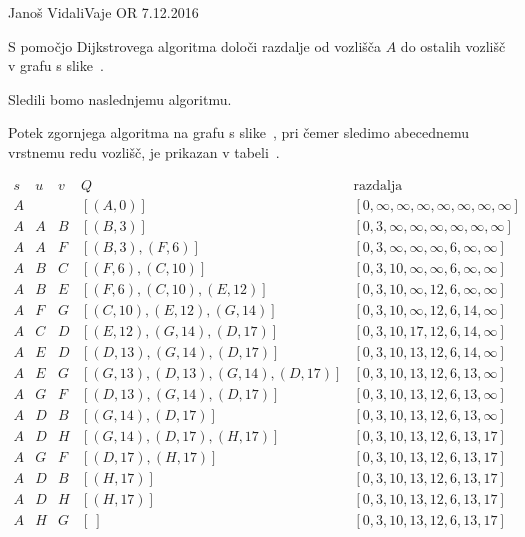 \begin{naloga}{Janoš Vidali}{Vaje OR 7.12.2016}
\begin{vprasanje}
S pomočjo Dijkstrovega algoritma
določi razdalje od vozlišča $A$ do ostalih vozlišč
v grafu s slike~\fig.

\begin{slika}
\pgfslika
{}
\end{slika}
\end{vprasanje}


\begin{odgovor}
Sledili bomo naslednjemu algoritmu.

Potek zgornjega algoritma na grafu s slike~\fig,
pri čemer sledimo abecednemu vrstnemu redu vozlišč,
je prikazan v tabeli~\tab.


\begin{tabela}
$$
\begin{array}{c|c|c|c|c}
s & u & v & Q & \text{razdalja} \\ \hline
A &   &   & [(A,0)]  & [0, \infty, \infty, \infty, \infty, \infty, \infty, \infty] \\
A & A  &  B & [(B, 3)]  & [0, 3, \infty, \infty, \infty, \infty, \infty, \infty] \\
A & A  &  F & [(B, 3), (F, 6)]  & [0, 3, \infty, \infty, \infty, 6, \infty, \infty] \\
A & B  & C & [(F, 6), (C, 10)]  & [0, 3, 10, \infty, \infty, 6, \infty, \infty] \\
A & B  & E & [(F, 6), (C, 10), (E, 12)]  & [0, 3, 10, \infty, 12, 6, \infty, \infty] \\
A & F  & G & [(C, 10), (E, 12), (G, 14)]  & [0, 3, 10, \infty, 12, 6, 14, \infty] \\
A & C  & D & [(E, 12), (G, 14), (D, 17)]  & [0, 3, 10, 17, 12, 6, 14, \infty] \\
A & E  & D & [(D, 13), (G, 14), (D, 17)]  & [0, 3, 10, 13, 12, 6, 14, \infty] \\
A & E  & G & [(G, 13), (D, 13), (G, 14), (D, 17)]  & [0, 3, 10, 13, 12, 6, 13, \infty] \\
A & G  & F & [(D, 13), (G, 14), (D, 17)]  & [0, 3, 10, 13, 12, 6, 13, \infty] \\
A & D  & B & [(G, 14), (D, 17)]  & [0, 3, 10, 13, 12, 6, 13, \infty] \\
A & D  & H & [(G, 14), (D, 17), (H, 17)]  & [0, 3, 10, 13, 12, 6, 13, 17] \\
A & G  & F & [(D, 17), (H, 17)]  & [0, 3, 10, 13, 12, 6, 13, 17] \\
A & D & B & [(H, 17)]  & [0, 3, 10, 13, 12, 6, 13, 17] \\
A & D & H & [(H, 17)]  & [0, 3, 10, 13, 12, 6, 13, 17] \\
A & H & G & [\ ]  & [0, 3, 10, 13, 12, 6, 13, 17] \\

\end{array}
$$
\end{tabela}


\end{odgovor}
\end{naloga}
